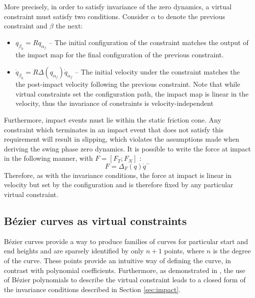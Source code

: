 More precisely, in order to satisfy invariance of the zero dynamics, a virtual constraint must satisfy two conditions. Consider $\alpha$ to denote the previous constraint and $\beta$ the next:
\begin{itemize}
	\item $q_{\beta_0} = Rq_{\alpha_f}$ -- The initial configuration of the constraint matches the output of the impact map for the final configuration of the previous constraint.
	\item $\dot{q}_{\beta_0} = R\Delta\left(q_{\alpha_f}\right)\dot{q}_{\alpha_f}$ -- The initial velocity under the constraint matches the the post-impact velocity following the previous constraint. Note that while virtual constraints set the configuration path, the impact map is linear in the velocity, thus the invariance of constraints is velocity-independent
\end{itemize}

Furthermore, impact events must lie within the static friction cone. Any constraint which terminates in an impact event that does not satisfy this requirement will result in slipping, which violates the assumptions made when deriving the swing phase zero dynamics. It is possible to write the force at impact in the following manner, with $F = [F_T;F_N]$ \cite{westervelt2007feedback}:
\begin{equation}
	F = \Delta_{F}(q)\dot{q}^-
\end{equation}
Therefore, as with the invariance conditions, the force at impact is linear in velocity but set by the configuration and is therefore fixed by any particular virtual constraint.

\subsection{B{\'e}zier curves as virtual constraints}
Bézier curves provide a way to produce families of curves for particular start and end heights and are sparsely identified by only $n+1$ points, where $n$ is the degree of the curve. These points provide an intuitive way of defining the curve, in contrast with polynomial coefficients. Furthermore, as demonstrated in \cite{westervelt2007feedback}, the use of Bézier polynomials to describe the virtual constraint leads to a closed form of the invariance conditions described in Section \ref{sec:impact}. \\

